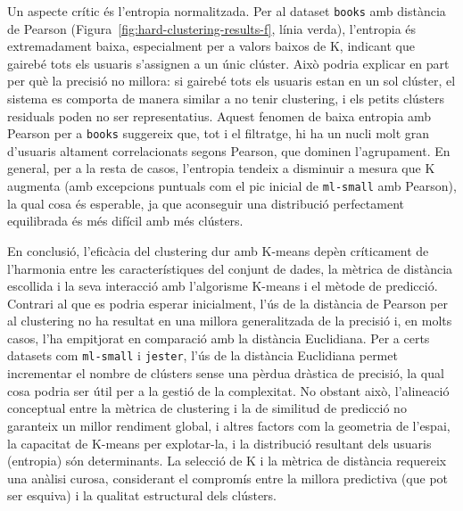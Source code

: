 \documentclass[a4paper,12pt]{report}
\begin{document}
Un aspecte crític és l'entropia normalitzada. Per al dataset \texttt{books} amb distància de Pearson (Figura~\ref{fig:hard-clustering-results-f}, línia verda), l'entropia és extremadament baixa, especialment per a valors baixos de K, indicant que gairebé tots els usuaris s'assignen a un únic clúster. Això podria explicar en part per què la precisió no millora: si gairebé tots els usuaris estan en un sol clúster, el sistema es comporta de manera similar a no tenir clustering, i els petits clústers residuals poden no ser representatius. Aquest fenomen de baixa entropia amb Pearson per a \texttt{books} suggereix que, tot i el filtratge, hi ha un nucli molt gran d'usuaris altament correlacionats segons Pearson, que dominen l'agrupament. En general, per a la resta de casos, l'entropia tendeix a disminuir a mesura que K augmenta (amb excepcions puntuals com el pic inicial de \texttt{ml-small} amb Pearson), la qual cosa és esperable, ja que aconseguir una distribució perfectament equilibrada és més difícil amb més clústers.

En conclusió, l'eficàcia del clustering dur amb K-means depèn críticament de l'harmonia entre les característiques del conjunt de dades, la mètrica de distància escollida i la seva interacció amb l'algorisme K-means i el mètode de predicció. Contrari al que es podria esperar inicialment, l'ús de la distància de Pearson per al clustering no ha resultat en una millora generalitzada de la precisió i, en molts casos, l'ha empitjorat en comparació amb la distància Euclidiana. Per a certs datasets com \texttt{ml-small} i \texttt{jester}, l'ús de la distància Euclidiana permet incrementar el nombre de clústers sense una pèrdua dràstica de precisió, la qual cosa podria ser útil per a la gestió de la complexitat. No obstant això, l'alineació conceptual entre la mètrica de clustering i la de similitud de predicció no garanteix un millor rendiment global, i altres factors com la geometria de l'espai, la capacitat de K-means per explotar-la, i la distribució resultant dels usuaris (entropia) són determinants. La selecció de K i la mètrica de distància requereix una anàlisi curosa, considerant el compromís entre la millora predictiva (que pot ser esquiva) i la qualitat estructural dels clústers.
\end{document}
